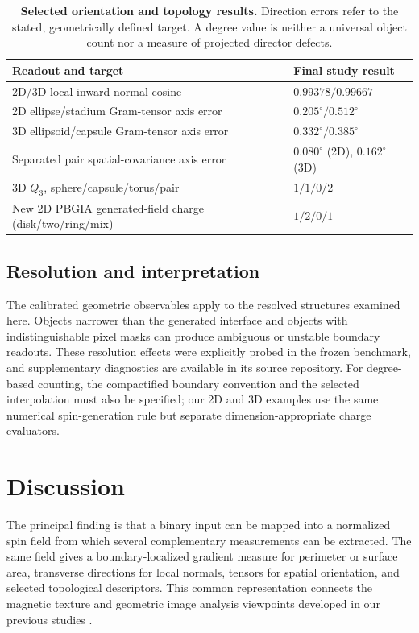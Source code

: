 \documentclass[11pt,a4paper]{article}
\begin{document}
\begin{table}[t]
\centering\caption{\textbf{Selected orientation and topology results.} Direction errors refer to the stated, geometrically defined target. A degree value is neither a universal object count nor a measure of projected director defects.}\label{tab:directiontopology}
\small\begin{tabularx}{\linewidth}{@{}p{.47\linewidth}X@{}}\toprule
Readout and target & Final study result\\\midrule
2D/3D local inward normal cosine & \(0.99378/0.99667\)\\
2D ellipse/stadium Gram-tensor axis error & \(0.205^\circ/0.512^\circ\)\\
3D ellipsoid/capsule Gram-tensor axis error & \(0.332^\circ/0.385^\circ\)\\
Separated pair spatial-covariance axis error & \(0.080^\circ\) (2D), \(0.162^\circ\) (3D)\\
3D \(Q_3\), sphere/capsule/torus/pair & \(1/1/0/2\)\\
New 2D PBGIA generated-field charge (disk/two/ring/mix) & $1/2/0/1$\\\bottomrule
\end{tabularx}
\end{table}

\subsection{Resolution and interpretation}\label{subsec:impl:limits}
The calibrated geometric observables apply to the resolved structures examined here. Objects narrower than the generated interface and objects with indistinguishable pixel masks can produce ambiguous or unstable boundary readouts. These resolution effects were explicitly probed in the frozen benchmark, and supplementary diagnostics are available in its source repository. For degree-based counting, the compactified boundary convention and the selected interpolation must also be specified; our 2D and 3D examples use the same numerical spin-generation rule but separate dimension-appropriate charge evaluators.

\FloatBarrier
\section{Discussion}\label{sec:discussion}
The principal finding is that a binary input can be mapped into a normalized spin field from which several complementary measurements can be extracted. The same field gives a boundary-localized gradient measure for perimeter or surface area, transverse directions for local normals, tensors for spatial orientation, and selected topological descriptors. This common representation connects the magnetic texture and geometric image analysis viewpoints developed in our previous studies \cite{Park2024AMT,Moon2025SR,Park2025iScience}.
\end{document}

